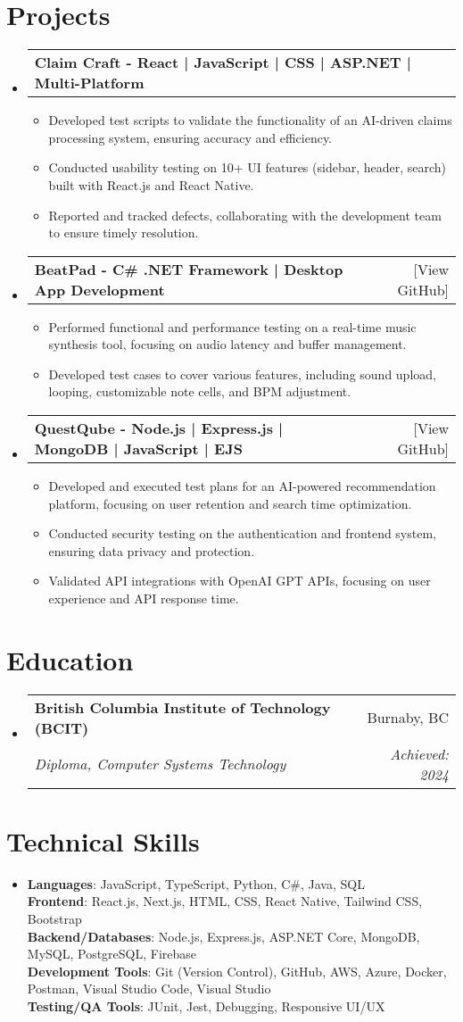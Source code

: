 \documentclass[letterpaper,11pt]{article}
\makeatletter
\newcommand{\resumeItem}[1]{
\item\small{
{#1 \vspace{-2pt}}
}
}
\newcommand{\resumeSubheading}[4]{
\vspace{-2pt}\item
\begin{tabular*}{0.97\textwidth}[t]{l@{\extracolsep{\fill}}r}
\textbf{#1} & #2 \\
\textit{\small#3} & \textit{\small #4} \\
\end{tabular*}\vspace{-7pt}
}
\newcommand{\resumeProjectHeading}[2]{
\item
\begin{tabular*}{0.97\textwidth}{l@{\extracolsep{\fill}}r}
\small#1 & #2 \\
\end{tabular*}\vspace{-7pt}
}
\newcommand{\resumeSubHeadingListStart}{\begin{itemize}[leftmargin=0.15in, label={}]}
\newcommand{\resumeSubHeadingListEnd}{\end{itemize}}
\newcommand{\resumeItemListStart}{\begin{itemize}}
\newcommand{\resumeItemListEnd}{\end{itemize}\vspace{-5pt}}
\makeatother
\begin{document}
\section{Projects}
\resumeSubHeadingListStart
\resumeProjectHeading{\textbf{Claim Craft - React | JavaScript | CSS | ASP.NET | Multi-Platform}}{}
\resumeItemListStart
\resumeItem{Developed test scripts to validate the functionality of an AI-driven claims processing system, ensuring accuracy and efficiency.}
\resumeItem{Conducted usability testing on 10+ UI features (sidebar, header, search) built with React.js and React Native.}
\resumeItem{Reported and tracked defects, collaborating with the development team to ensure timely resolution.}
\resumeItemListEnd

\resumeProjectHeading{\textbf{BeatPad - C\# .NET Framework | Desktop App Development}}{[View GitHub]}
\resumeItemListStart
\resumeItem{Performed functional and performance testing on a real-time music synthesis tool, focusing on audio latency and buffer management.}
\resumeItem{Developed test cases to cover various features, including sound upload, looping, customizable note cells, and BPM adjustment.}
\resumeItemListEnd

\resumeProjectHeading{\textbf{QuestQube - Node.js | Express.js | MongoDB | JavaScript | EJS}}{[View GitHub]}
\resumeItemListStart
\resumeItem{Developed and executed test plans for an AI-powered recommendation platform, focusing on user retention and search time optimization.}
\resumeItem{Conducted security testing on the authentication and frontend system, ensuring data privacy and protection.}
\resumeItem{Validated API integrations with OpenAI GPT APIs, focusing on user experience and API response time.}
\resumeItemListEnd
\resumeSubHeadingListEnd

\section{Education}
\resumeSubHeadingListStart
\resumeSubheading{British Columbia Institute of Technology (BCIT)}{Burnaby, BC}{Diploma, Computer Systems Technology}{Achieved: 2024}
\resumeSubHeadingListEnd

\section{Technical Skills}
\begin{itemize}[leftmargin=0.15in, label={}]
\item{
\textbf{Languages}{: JavaScript, TypeScript, Python, C\#, Java, SQL} \\
\textbf{Frontend}{: React.js, Next.js, HTML, CSS, React Native, Tailwind CSS, Bootstrap} \\
\textbf{Backend/Databases}{: Node.js, Express.js, ASP.NET Core, MongoDB, MySQL, PostgreSQL, Firebase} \\
\textbf{Development Tools}{: Git (Version Control), GitHub, AWS, Azure, Docker, Postman, Visual Studio Code, Visual Studio} \\
\textbf{Testing/QA Tools}{: JUnit, Jest, Debugging, Responsive UI/UX}
} \\
\end{itemize}


\end{document}
